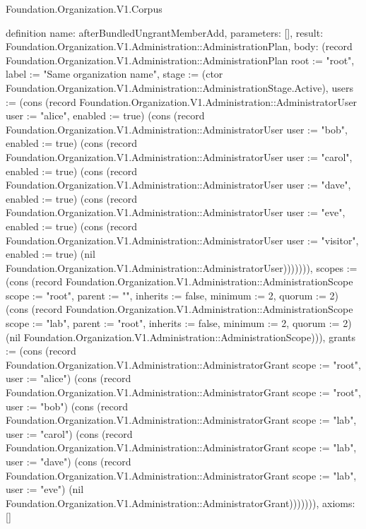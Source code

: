 \begin{lexlean}{Foundation.Organization.V1.Corpus}
\begin{semanticmodule}
definition{
  name: afterBundledUngrantMemberAdd,
  parameters: [],
  result: Foundation.Organization.V1.Administration::AdministrationPlan,
  body: (record Foundation.Organization.V1.Administration::AdministrationPlan {root := "root", label := "Same organization name", stage := (ctor Foundation.Organization.V1.Administration::AdministrationStage.Active), users := (cons (record Foundation.Organization.V1.Administration::AdministratorUser {user := "alice", enabled := true}) (cons (record Foundation.Organization.V1.Administration::AdministratorUser {user := "bob", enabled := true}) (cons (record Foundation.Organization.V1.Administration::AdministratorUser {user := "carol", enabled := true}) (cons (record Foundation.Organization.V1.Administration::AdministratorUser {user := "dave", enabled := true}) (cons (record Foundation.Organization.V1.Administration::AdministratorUser {user := "eve", enabled := true}) (cons (record Foundation.Organization.V1.Administration::AdministratorUser {user := "visitor", enabled := true}) (nil Foundation.Organization.V1.Administration::AdministratorUser))))))), scopes := (cons (record Foundation.Organization.V1.Administration::AdministrationScope {scope := "root", parent := "", inherits := false, minimum := 2, quorum := 2}) (cons (record Foundation.Organization.V1.Administration::AdministrationScope {scope := "lab", parent := "root", inherits := false, minimum := 2, quorum := 2}) (nil Foundation.Organization.V1.Administration::AdministrationScope))), grants := (cons (record Foundation.Organization.V1.Administration::AdministratorGrant {scope := "root", user := "alice"}) (cons (record Foundation.Organization.V1.Administration::AdministratorGrant {scope := "root", user := "bob"}) (cons (record Foundation.Organization.V1.Administration::AdministratorGrant {scope := "lab", user := "carol"}) (cons (record Foundation.Organization.V1.Administration::AdministratorGrant {scope := "lab", user := "dave"}) (cons (record Foundation.Organization.V1.Administration::AdministratorGrant {scope := "lab", user := "eve"}) (nil Foundation.Organization.V1.Administration::AdministratorGrant))))))}),
  axioms: []
}


\end{semanticmodule}
\end{lexlean}

